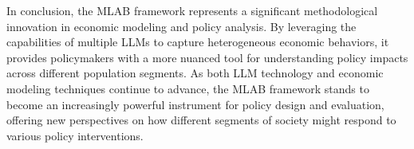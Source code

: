 \documentclass[12pt]{article}
\begin{document}
\begin{CJK*}{UTF8}{gbsn}
In conclusion, the MLAB framework represents a significant methodological innovation in economic modeling and policy analysis. By leveraging the capabilities of multiple LLMs to capture heterogeneous economic behaviors, it provides policymakers with a more nuanced tool for understanding policy impacts across different population segments. As both LLM technology and economic modeling techniques continue to advance, the MLAB framework stands to become an increasingly powerful instrument for policy design and evaluation, offering new perspectives on how different segments of society might respond to various policy interventions.
\newpage 
%

\end{CJK*}
\end{document}
